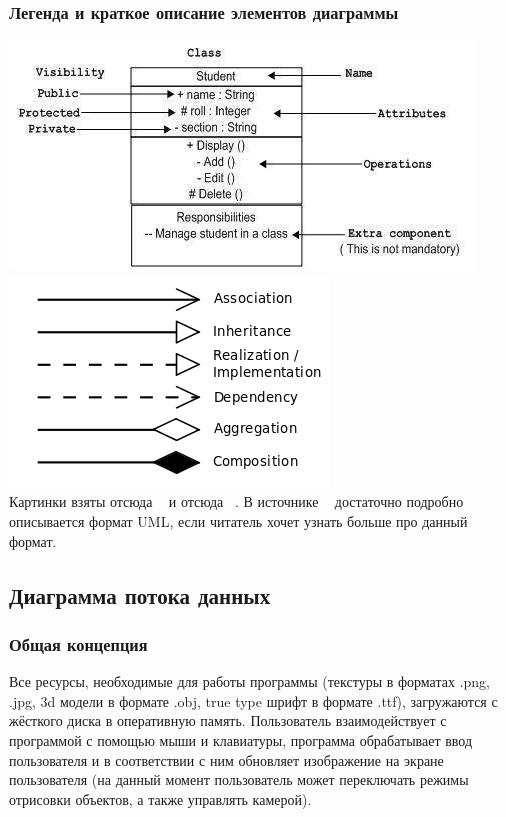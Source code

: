 \documentclass{article}
\begin{document}
\subsubsection{Легенда и краткое описание элементов диаграммы}
\includegraphics[scale=0.5]{notation_class.jpg}
\includegraphics[scale=0.5]{Uml_classes_en.svg.png}\\
Картинки взяты отсюда ~\cite{uml1} и отсюда ~\cite{uml2}. В источнике ~\cite{uml2} достаточно подробно описывается формат UML, если читатель хочет узнать больше про данный формат.
\subsection{Диаграмма потока данных}
\subsubsection{Общая концепция}
Все ресурсы, необходимые для работы программы (текстуры в форматах .png, .jpg, 3d модели в формате .obj, true type шрифт в формате .ttf), загружаются с жёсткого диска в оперативную память. Пользователь взаимодействует с программой с помощью мыши и клавиатуры, программа обрабатывает ввод пользователя и в соответствии с ним обновляет изображение на экране пользователя (на данный момент пользователь может переключать режимы отрисовки объектов, а также управлять камерой).
\end{document}
